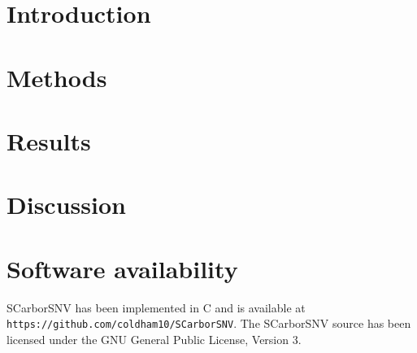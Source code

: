 \documentclass{article}
\begin{document}
\nocite{*}


\doublespacing


\section{Introduction}


\section{Methods}


\section{Results}


\section{Discussion}



\section{Software availability}
SCarborSNV has been implemented in C and is available at \texttt{https://github.com/coldham10/SCarborSNV}. 
The SCarborSNV source has been licensed under the GNU General Public License, Version 3.




\newpage



\newpage
\appendix

\end{document}
